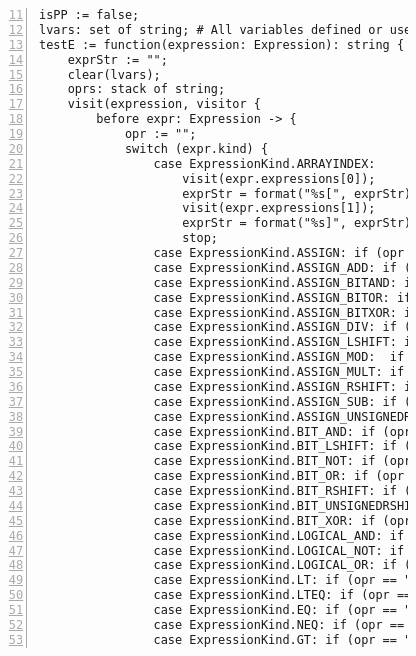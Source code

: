 \begin{figure}[ht!]
\begin{lstlisting}[numbers=left, tabsize=4, escapechar=@, caption={API Usage Mining Analysis},label={lst:aun-code}, firstline = 11, firstnumber = 11, lastline = 60]
isPP := false;
lvars: set of string; # All variables defined or used in a node
testE := function(expression: Expression): string {
    exprStr := "";
    clear(lvars);
    oprs: stack of string;
    visit(expression, visitor {
        before expr: Expression -> {
            opr := "";
            switch (expr.kind) {
                case ExpressionKind.ARRAYINDEX:
                    visit(expr.expressions[0]);
                    exprStr = format("%s[", exprStr);
                    visit(expr.expressions[1]);
                    exprStr = format("%s]", exprStr);
                    stop;
                case ExpressionKind.ASSIGN: if (opr == "") opr = "="; 
                case ExpressionKind.ASSIGN_ADD: if (opr == "") opr = "+="; 
                case ExpressionKind.ASSIGN_BITAND: if (opr == "") opr = "&="; 
                case ExpressionKind.ASSIGN_BITOR: if (opr == "") opr = "|="; 
                case ExpressionKind.ASSIGN_BITXOR: if (opr == "") opr = "^="; 
                case ExpressionKind.ASSIGN_DIV: if (opr == "") opr = "/="; 
                case ExpressionKind.ASSIGN_LSHIFT: if (opr == "") opr = "<<="; 
                case ExpressionKind.ASSIGN_MOD:  if (opr == "") opr = "%="; 
                case ExpressionKind.ASSIGN_MULT: if (opr == "") opr = "*="; 
                case ExpressionKind.ASSIGN_RSHIFT: if (opr == "") opr = ">>="; 
                case ExpressionKind.ASSIGN_SUB: if (opr == "") opr = "-="; 
                case ExpressionKind.ASSIGN_UNSIGNEDRSHIFT: if (opr == "") opr = ">>>="; 
                case ExpressionKind.BIT_AND: if (opr == "") opr = "&"; 
                case ExpressionKind.BIT_LSHIFT: if (opr == "") opr = "<<"; 
                case ExpressionKind.BIT_NOT: if (opr == "") opr = "~"; 
                case ExpressionKind.BIT_OR: if (opr == "") opr = "|"; 
                case ExpressionKind.BIT_RSHIFT: if (opr == "") opr = ">>"; 
                case ExpressionKind.BIT_UNSIGNEDRSHIFT: if (opr == "") opr = ">>>"; 
                case ExpressionKind.BIT_XOR: if (opr == "") opr = "^"; 
                case ExpressionKind.LOGICAL_AND: if (opr == "") opr = "&&"; 
                case ExpressionKind.LOGICAL_NOT: if (opr == "") opr = "!";
                case ExpressionKind.LOGICAL_OR: if (opr == "") opr = "||";
                case ExpressionKind.LT: if (opr == "") opr = "<";
                case ExpressionKind.LTEQ: if (opr == "") opr = "<="; 
                case ExpressionKind.EQ: if (opr == "") opr = "==";
                case ExpressionKind.NEQ: if (opr == "") opr = "!=";
                case ExpressionKind.GT: if (opr == "") opr = ">";

\end{lstlisting}
\end{figure}
